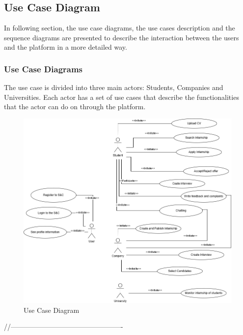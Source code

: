 \subsection{Use Case Diagram}
In following section, the use case diagrams, the use cases description and the sequence diagrams are presented to describe 
the interaction between the users and the platform in a more detailed way.

\subsubsection{Use Case Diagrams}
The use case is divided into three main actors: Students, Companies and Universities. Each actor has a set of use cases that
describe the functionalities that the actor can do on through the platform.
\begin{figure}[H]
    \centering
    \includegraphics[width=1\textwidth]{Images/Use_Cases _Diagram.png}
    \caption{Use Case Diagram}
\end{figure}

//-------------------------------------------------
